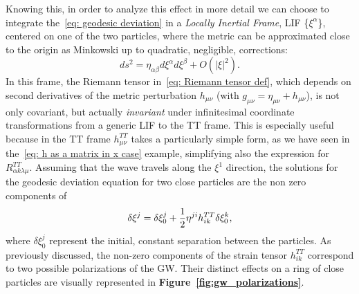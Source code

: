 Knowing this, in order to analyze this effect in more detail we can choose to integrate the~\eqref{eq: geodesic deviation} in a \textit{Locally Inertial Frame}, LIF \{$\xi^\alpha$\}, centered on one of the two particles, where the metric can be approximated close to the origin as Minkowski up to quadratic, negligible, corrections:
\[
    ds^2 = \eta_{\alpha\beta} d\xi^\alpha d\xi^\beta + O(|\xi|^2).
\]
In this frame, the Riemann tensor in~\eqref{eq: Riemann tensor def}, which depends on second derivatives of the metric perturbation $h_{\mu\nu}$ (with $g_{\mu\nu} = \eta_{\mu\nu} + h_{\mu\nu}$), is not only covariant, but actually \textit{invariant} under infinitesimal coordinate transformations from a generic LIF to the TT frame. 
This is especially useful because in the TT frame $h^{TT}_{\mu\nu}$ takes a particularly simple form, as we have seen in the~\eqref{eq: h as a matrix in x case} example, simplifying also the expression for $R^{TT}_{\alpha k \lambda \mu}$. 
Assuming that the wave travels along the $\xi^1$ direction, the solutions for the geodesic deviation equation for two close particles are the non zero components of 
\begin{equation}
    \delta\xi^j = \delta\xi_0^j + \frac{1}{2}\eta^{ji} h^{TT}_{ik} \delta\xi_0^k,
    \notag
\end{equation}
where $\delta\xi_0^j$ represent the initial, constant separation between the particles. 
As previously discussed, the non-zero components of the strain tensor $h_{ik}^{TT}$ correspond to two possible polarizations of the GW.\@
Their distinct effects on a ring of close particles are visually represented in \textbf{Figure~\ref{fig:gw_polarizations}}.
